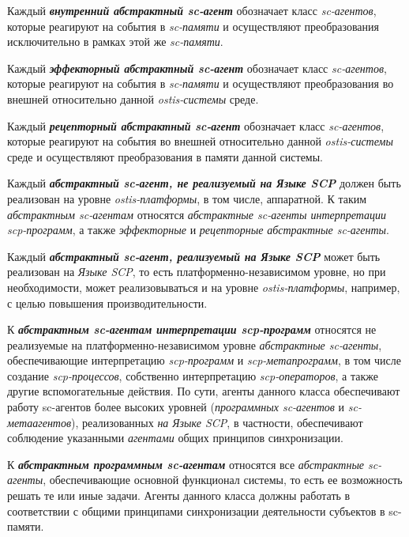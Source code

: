 Каждый \textbf{\textit{внутренний абстрактный sc-агент}} обозначает класс \textit{sc-агентов}, которые реагируют на события в \textit{sc-памяти} и осуществляют преобразования исключительно в рамках этой же \textit{sc-памяти}.

Каждый \textbf{\textit{эффекторный абстрактный sc-агент}} обозначает класс \textit{sc-агентов}, которые реагируют на события в \textit{sc-памяти} и осуществляют преобразования во внешней относительно данной \textit{ostis-системы} среде.

Каждый \textbf{\textit{рецепторный абстрактный sc-агент}} обозначает класс \textit{sc-агентов}, которые реагируют на события во внешней относительно данной \textit{ostis-системы} среде и осуществляют преобразования в памяти данной системы.

Каждый \textbf{\textit{абстрактный sc-агент, не реализуемый на Языке SCP}} должен быть реализован на уровне \textit{ostis-платформы}, в том числе, аппаратной. К таким \textit{абстрактным sc-агентам} относятся \textit{абстрактные sc-агенты интерпретации scp-программ}, а также \textit{эффекторные} и \textit{рецепторные абстрактные sc-агенты}.

Каждый \textbf{\textit{абстрактный sc-агент, реализуемый на Языке SCP}} может быть реализован на \textit{Языке SCP}, то есть платформенно-независимом уровне, но при необходимости, может реализовываться и на уровне \textit{ostis-платформы}, например, с целью повышения производительности.

К \textbf{\textit{абстрактным sc-агентам интерпретации scp-программ}} относятся не реализуемые на платформенно-независимом уровне \textit{абстрактные sc-агенты}, обеспечивающие интерпретацию \textit{scp-программ} и \textit{\mbox{scp-метапрограмм}}, в том числе создание \textit{scp-процессов}, собственно интерпретацию \textit{scp-операторов}, а также другие вспомогательные действия. По сути, агенты данного класса обеспечивают работу sc-агентов более высоких уровней (\textit{программных sc-агентов} и \textit{sc-метаагентов}), реализованных\textit{ на Языке SCP}, в частности, обеспечивают соблюдение указанными \textit{агентами} общих принципов синхронизации.

К \textbf{\textit{абстрактным программным sc-агентам}} относятся все \textit{абстрактные sc-агенты}, обеспечивающие основной функционал системы, то есть ее возможность решать те или иные задачи. Агенты данного класса должны работать в соответствии с общими принципами синхронизации деятельности субъектов в sc-памяти.

